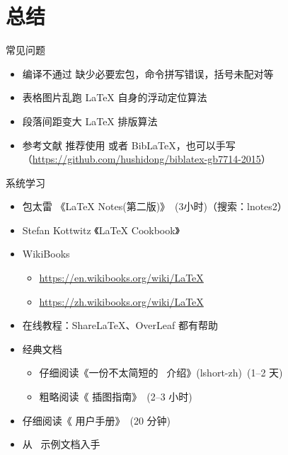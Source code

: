 \section{总结}

\begin{frame}{常见问题}
  \begin{itemize}
    \item \alert{编译不通过} 缺少必要宏包，命令拼写错误，括号未配对等
    \item \alert{表格图片乱跑} \LaTeX{} 自身的浮动定位算法
    \item \alert{段落间距变大} \LaTeX{} 排版算法
    \item \alert{参考文献} 推荐使用 \BibTeX{} 或者 Bib\LaTeX{}，也可以手写 
        （\url{https://github.com/hushidong/biblatex-gb7714-2015}）
  \end{itemize}
\end{frame}

\begin{frame}{系统学习}
  \begin{itemize}
      \item 包太雷 《\LaTeX{} Notes(第二版)》~(3小时)（搜索：lnotes2）
      \item Stefan Kottwitz 《LaTeX Cookbook》
      \item WikiBooks
        \begin{itemize}
          \item \url{https://en.wikibooks.org/wiki/LaTeX}
          \item \url{https://zh.wikibooks.org/wiki/LaTeX}
        \end{itemize}
      \item 在线教程：ShareLaTeX、OverLeaf 都有帮助
      \item 经典文档
        \begin{itemize}
          \item 仔细阅读《一份不太简短的~\LaTeXe{} 介绍》(lshort-zh)~(1--2 天)
          \item 粗略阅读《\LaTeXe{} 插图指南》~(2--3 小时)
        \end{itemize}
      \item 仔细阅读《\ThuThesis{} 用户手册》~(20 分钟)
      \item 从~\ThuThesis{} 示例文档入手
  \end{itemize}
\end{frame}

